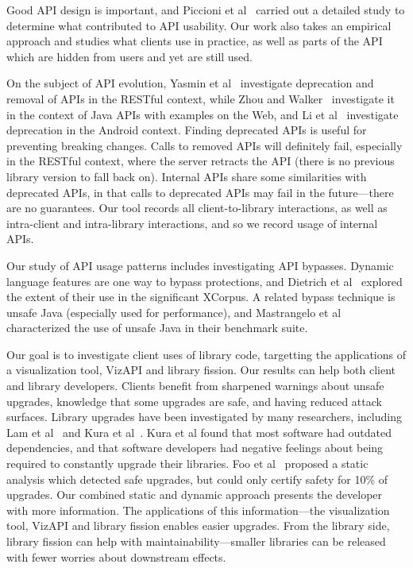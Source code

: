 Good API design is important, and Piccioni et al~\cite{piccioni13:_empir_study_api_usabil} carried out a detailed study to determine what contributed to API usability. Our work also takes an empirical approach and studies what clients use in practice, as well as parts of the API which are hidden from users and yet are still used. 

On the subject of API evolution, Yasmin et al~\cite{yasmin20:_first_look_deprec_restf_apis} investigate deprecation and removal of APIs in the RESTful context, while Zhou and Walker~\cite{zhou16:_api_deprec} investigate it in the context of Java APIs with examples on the Web, and Li et al~\cite{li18:_charac_deprec_android_apis} investigate deprecation in the Android context. Finding deprecated APIs is useful for preventing breaking changes. Calls to removed APIs will definitely fail, especially in the RESTful context, where the server retracts the API (there is no previous library version to fall back on). Internal APIs share some similarities with deprecated APIs, in that calls to deprecated APIs may fail in the future---there are no guarantees. Our tool records all client-to-library interactions, as well as intra-client and intra-library interactions, and so we record usage of internal APIs.

Our study of API usage patterns includes investigating API bypasses. Dynamic language features are one way to bypass protections,
and Dietrich et al~\cite{dietrich2017xcorpus} explored the extent of their use in the significant XCorpus. A related bypass technique
is unsafe Java (especially used for performance), and Mastrangelo et al~\cite{mastrangelo15:_use_your_own_risk} characterized the
use of unsafe Java in their benchmark suite.

Our goal is to investigate client uses of library code, targetting the applications of a visualization tool, VizAPI and library fission. Our results can help both client and library developers. Clients benefit from sharpened warnings about unsafe upgrades, knowledge that some upgrades are safe, and having reduced attack surfaces. Library upgrades have been investigated by many researchers, including Lam et al~\cite{lam20:_puttin_seman_seman_version} and Kura et al~\cite{kula18:_do_devel_updat_their_librar_depen}. Kura et al found that most software had outdated dependencies, and that software developers had negative feelings about being required to constantly upgrade their libraries. Foo et al~\cite{foo18:_effic_static_check_librar_updat} proposed a static analysis which detected safe upgrades, but could only certify safety for 10\% of upgrades. Our combined static and dynamic approach presents the developer with more information. The applications of this information---the visualization tool, VizAPI and library fission enables easier upgrades. From the library side, library fission can help with maintainability---smaller libraries can be released with fewer worries about downstream effects.


